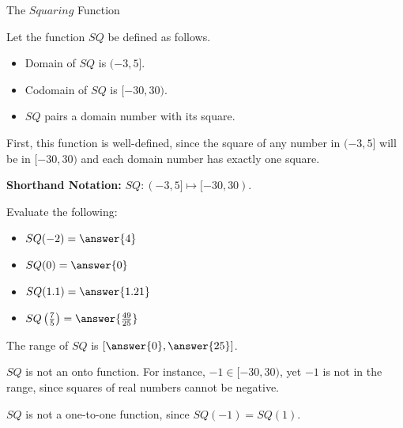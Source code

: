 \documentclass{ximera}
\begin{document}
\begin{example} The $Squaring$ Function 

Let the function $SQ$ be defined as follows.


\begin{itemize}
\item Domain of $SQ$ is $(-3, 5]$.
\item Codomain of $SQ$ is $[-30, 30)$.
\item $SQ$ pairs a domain number with its square.
\end{itemize}


First, this function is well-defined, since the square of any number in $(-3, 5]$ will be in $[-30, 30)$ and each domain number has exactly one square.


\textbf{Shorthand Notation: } $SQ: (-3, 5] \mapsto [-30, 30)$.

\begin{question} 


Evaluate the following:

\begin{itemize}
	\item $SQ(-2) = \answer{4}$
	\item $SQ(0) = \answer{0}$
	\item $SQ(1.1) = \answer{1.21}$
	\item $SQ\left(\frac{7}{5}\right) = \answer{\frac{49}{25}}$
\end{itemize}

\end{question}




\begin{question} 


The range of $SQ$ is $\left[ \answer{0}, \answer{25} \right]$.

\end{question}

$SQ$ is not an onto function.  For instance, $-1 \in [-30,30)$, yet $-1$ is not in the range, since squares of real numbers cannot be negative. 


$SQ$ is not a one-to-one function, since $SQ(-1)=SQ(1)$.
\end{example}
\end{document}
